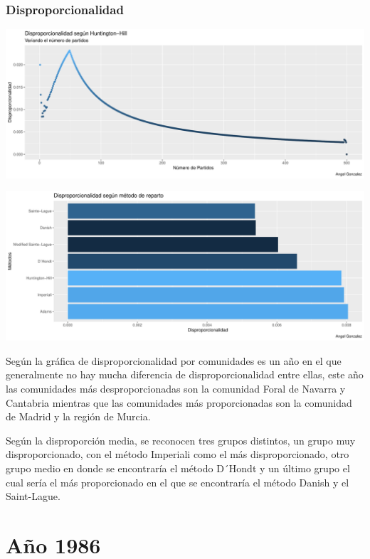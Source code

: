 \documentclass[12pt,a4paper,]{book}
\numberwithin{dummy}{section}
\theoremstyle{ocrenumbox}
\theoremstyle{blacknumex}
\theoremstyle{blacknumbox}
\theoremstyle{ocrenum}
\theoremstyle{ocrenum}
\begin{document}
\hypertarget{disproporcionalidad-2}{%
\subsubsection{Disproporcionalidad}\label{disproporcionalidad-2}}

\begin{center}\includegraphics[width=0.95\linewidth]{figurasR/unnamed-chunk-30-1} \end{center}

\begin{center}\includegraphics[width=0.95\linewidth]{figurasR/unnamed-chunk-30-2} \end{center}

Según la gráfica de disproporcionalidad por comunidades es un año en el
que generalmente no hay mucha diferencia de disproporcionalidad entre
ellas, este año las comunidades más desproporcionadas son la comunidad
Foral de Navarra y Cantabria mientras que las comunidades más
proporcionadas son la comunidad de Madrid y la región de Murcia.

Según la disproporción media, se reconocen tres grupos distintos, un
grupo muy disproporcionado, con el método Imperiali como el más
disproporcionado, otro grupo medio en donde se encontraría el método
D´Hondt y un último grupo el cual sería el más proporcionado en el que
se encontraría el método Danish y el Saint-Lague.

\hypertarget{auxf1o-1986}{%
\section{Año 1986}\label{auxf1o-1986}}
\end{document}
